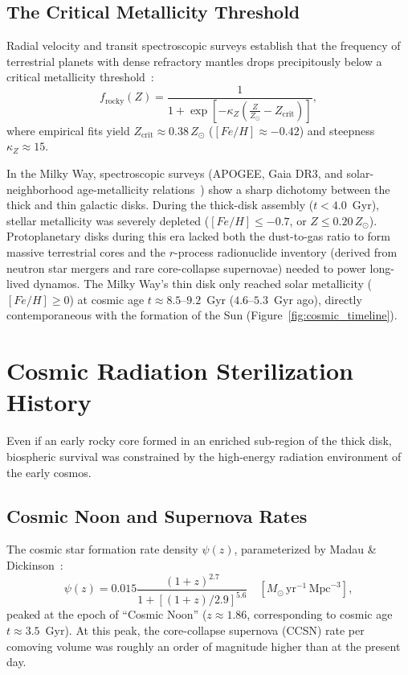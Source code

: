 \documentclass[11pt,a4paper]{article}
\begin{document}
\subsection{The Critical Metallicity Threshold}

Radial velocity and transit spectroscopic surveys establish that the frequency of terrestrial planets with dense refractory mantles drops precipitously below a critical metallicity threshold~\cite{buchhave2012,buchhave2014}:
\begin{equation}
f_{\mathrm{rocky}}(Z) = \frac{1}{1 + \exp\left[ -\kappa_Z \left( \frac{Z}{Z_\odot} - Z_{\mathrm{crit}} \right) \right]},
\label{eq:f_rocky}
\end{equation}
where empirical fits yield $Z_{\mathrm{crit}} \approx 0.38\,Z_\odot$ ($[Fe/H] \approx -0.42$) and steepness $\kappa_Z \approx 15$. 

In the Milky Way, spectroscopic surveys (APOGEE, Gaia DR3, and solar-neighborhood age-metallicity relations~\cite{snaith2015,hayden2015}) show a sharp dichotomy between the thick and thin galactic disks. During the thick-disk assembly ($t < 4.0$~Gyr), stellar metallicity was severely depleted ($[Fe/H] \le -0.7$, or $Z \le 0.20\,Z_\odot$). Protoplanetary disks during this era lacked both the dust-to-gas ratio to form massive terrestrial cores and the $r$-process radionuclide inventory (derived from neutron star mergers and rare core-collapse supernovae) needed to power long-lived dynamos. The Milky Way's thin disk only reached solar metallicity ($[Fe/H] \ge 0$) at cosmic age $t \approx 8.5\text{--}9.2$~Gyr ($4.6\text{--}5.3$~Gyr ago), directly contemporaneous with the formation of the Sun (Figure~\ref{fig:cosmic_timeline}).

\section{Cosmic Radiation Sterilization History}
\label{sec:radiation}

Even if an early rocky core formed in an enriched sub-region of the thick disk, biospheric survival was constrained by the high-energy radiation environment of the early cosmos.

\subsection{Cosmic Noon and Supernova Rates}

The cosmic star formation rate density $\psi(z)$, parameterized by Madau \& Dickinson~\cite{madau2014}:
\begin{equation}
\psi(z) = 0.015 \frac{(1+z)^{2.7}}{1 + \left[(1+z)/2.9\right]^{5.6}} \quad [M_\odot\,\mathrm{yr}^{-1}\,\mathrm{Mpc}^{-3}],
\label{eq:sfr}
\end{equation}
peaked at the epoch of ``Cosmic Noon'' ($z \approx 1.86$, corresponding to cosmic age $t \approx 3.5$~Gyr). At this peak, the core-collapse supernova (CCSN) rate per comoving volume was roughly an order of magnitude higher than at the present day.
\end{document}
